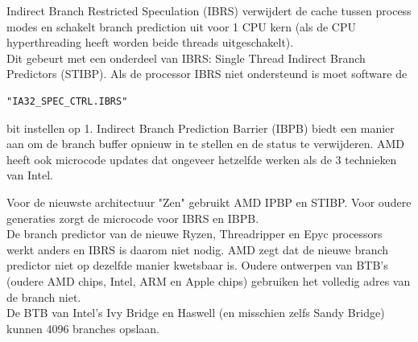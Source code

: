 Indirect Branch Restricted Speculation (IBRS) verwijdert de cache tussen process modes en schakelt branch prediction uit voor 1 CPU kern (als de CPU hyperthreading heeft worden beide threads uitgeschakelt).\\ Dit gebeurt met een onderdeel van IBRS: Single Thread Indirect Branch Predictors (STIBP).
Als de processor IBRS niet ondersteund is moet software de \begin{verbatim}"IA32_SPEC_CTRL.IBRS"\end{verbatim}
 bit instellen op 1.
Indirect Branch Prediction Barrier (IBPB) biedt een manier aan om de branch buffer opnieuw in te stellen en de status te verwijderen. AMD heeft ook microcode updates dat ongeveer hetzelfde werken als de 3 technieken van Intel.


Voor de nieuwste architectuur "Zen" gebruikt AMD IPBP en STIBP. Voor oudere generaties zorgt de microcode voor IBRS en IBPB.\\ De branch predictor van de nieuwe Ryzen, Threadripper en Epyc processors werkt anders en IBRS is daarom niet nodig. AMD zegt dat de nieuwe branch predictor niet op dezelfde manier kwetsbaar is. Oudere ontwerpen van BTB's (oudere AMD chips, Intel, ARM en Apple chips) gebruiken het volledig adres van de branch niet.\\
De BTB van Intel's Ivy Bridge en Haswell (en misschien zelfs Sandy Bridge) kunnen 4096 branches opslaan.\parencite{Godbolt2016}

